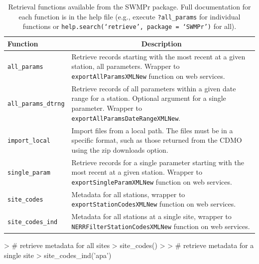 \begin{table}[!tbp]
\caption{Retrieval functions available from the SWMPr package. Full documentation for each function is in the help file (e.g., execute \texttt{?all\_params} for individual functions or \texttt{help.search(`retrieve', package = `SWMPr')} for all).\label{tab:retrieve}} 
\begin{center}
\begin{tabular}{lp{3.5in}}
\hline\hline
\multicolumn{1}{l}{Function}&\multicolumn{1}{c}{Description}\tabularnewline
\hline
\texttt{all\_params}&Retrieve records starting with the most recent at a given station, all parameters.  Wrapper to \texttt{exportAllParamsXMLNew} function on web services.\tabularnewline
\texttt{all\_params\_dtrng}&Retrieve records of all parameters within a given date range for a station.  Optional argument for a single parameter. Wrapper to \texttt{exportAllParamsDateRangeXMLNew}.\tabularnewline
\texttt{import\_local}&Import files from a local path.  The files must be in a specific format, such as those returned from the CDMO using the zip downloads option.\tabularnewline
\texttt{single\_param}&Retrieve records for a single parameter starting with the most recent at a given station.  Wrapper to \texttt{exportSingleParamXMLNew} function on web services.\tabularnewline
\texttt{site\_codes}&Metadata for all stations, wrapper to \texttt{exportStationCodesXMLNew} function on web services.\tabularnewline
\texttt{site\_codes\_ind}&Metadata for all stations at a single site, wrapper  to \texttt{NERRFilterStationCodesXMLNew} function on web services.\tabularnewline
\hline
\end{tabular}\end{center}

\end{table}


\begin{example}
> # retrieve metadata for all sites
> site_codes()
> 
> # retrieve metadata for a single site
> site_codes_ind('apa')
\end{example}

